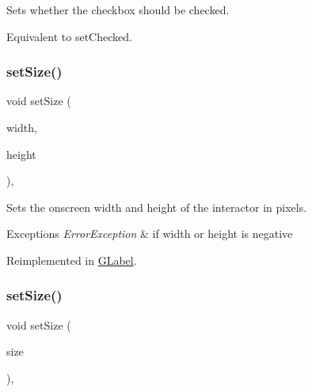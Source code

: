 Sets whether the checkbox should be checked. 

Equivalent to set\+Checked. \mbox{\label{classGInteractor_aca25d49481f9bf5fc8f7df4c086c4ce7}} 
\subsubsection{\texorpdfstring{set\+Size()}{setSize()}\hspace{0.1cm}{\footnotesize\ttfamily [1/2]}}
{\footnotesize\ttfamily void set\+Size (\begin{DoxyParamCaption}\item[{double}]{width,  }\item[{double}]{height }\end{DoxyParamCaption})\hspace{0.3cm}{\ttfamily [virtual]}, {\ttfamily [inherited]}}



Sets the onscreen width and height of the interactor in pixels. 


\begin{DoxyExceptions}{Exceptions}
{\em Error\+Exception} & if width or height is negative \\
\hline
\end{DoxyExceptions}


Reimplemented in \mbox{\hyperlink{classGLabel_a8ba9af72c23f52d4b93096a13a11f150}{G\+Label}}.

\mbox{\label{classGInteractor_ae2b628228f192c2702c4ce941b2af68f}} 
\subsubsection{\texorpdfstring{set\+Size()}{setSize()}\hspace{0.1cm}{\footnotesize\ttfamily [2/2]}}
{\footnotesize\ttfamily void set\+Size (\begin{DoxyParamCaption}\item[{const \mbox{\hyperlink{structGDimension}{G\+Dimension}} \&}]{size }\end{DoxyParamCaption})\hspace{0.3cm}{\ttfamily [virtual]}, {\ttfamily [inherited]}}



